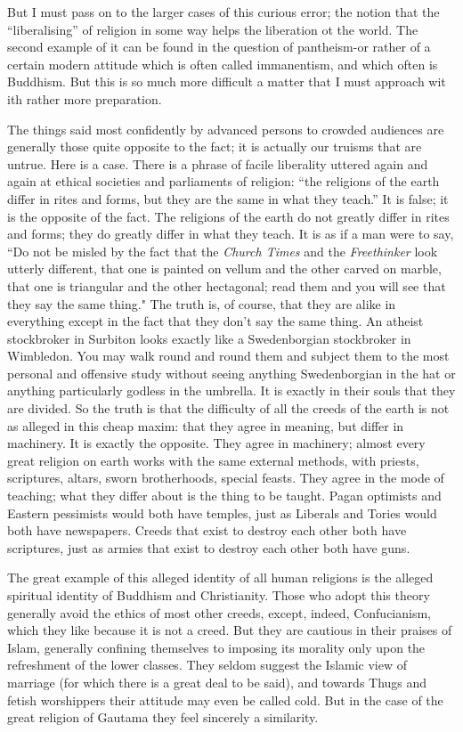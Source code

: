 \documentclass{book}
\begin{document}
But I must pass on to the larger cases of this curious error; the notion that the “liberalising” of religion in some way helps the liberation ot the world. The second example of it can be found in the question of pantheism-or rather of a certain modern attitude which is often called immanentism, and which often is Buddhism. But this is so much more difficult a matter that I must approach wit ith rather more preparation.

The things said most confidently by advanced persons to crowded audiences are generally those quite opposite to the fact; it is actually our truisms that are untrue. Here is a case. There is a phrase of facile liberality uttered again and again at ethical societies and parliaments of religion: “the religions of the earth differ in rites and forms, but they are the same in what they teach.” It is false; it is the opposite of the fact. The religions of the earth do not greatly differ in rites and forms; they do greatly differ in what they teach. It is as if a man were to say, “Do not be misled by the fact that the \emph{Church Times} and the \emph{Freethinker} look utterly different, that one is painted on vellum and the other carved on marble, that one is triangular and the other hectagonal; read them and you will see that they say the same thing." The truth is, of course, that they are alike in everything except in the fact that they don’t say the same thing. An atheist stockbroker in Surbiton looks exactly like a Swedenborgian stockbroker in Wimbledon. You may walk round and round them and subject them to the most personal and offensive study without seeing anything Swedenborgian in the hat or anything particularly godless in the umbrella. It is exactly in their souls that they are divided. So the truth is that the difficulty of all the creeds of the earth is not as alleged in this cheap maxim: that they agree in meaning, but differ in machinery. It is exactly the opposite. They agree in machinery; almost every great religion on earth works with the same external methods, with priests, scriptures, altars, sworn brotherhoods, special feasts. They agree in the mode of teaching; what they differ about is the thing to be taught. Pagan optimists and Eastern pessimists would both have temples, just as Liberals and Tories would both have newspapers. Creeds that exist to destroy each other both have scriptures, just as armies that exist to destroy each other both have guns.

The great example of this alleged identity of all human religions is the alleged spiritual identity of Buddhism and Christianity. Those who adopt this theory generally avoid the ethics of most other creeds, except, indeed, Confucianism, which they like because it is not a creed. But they are cautious in their praises of Islam, generally confining themselves to imposing its morality only upon the refreshment of the lower classes. They seldom suggest the Islamic view of marriage (for which there is a great deal to be said), and towards Thugs and fetish worshippers their attitude may even be called cold. But in the case of the great religion of Gautama they feel sincerely a similarity.
\end{document}
